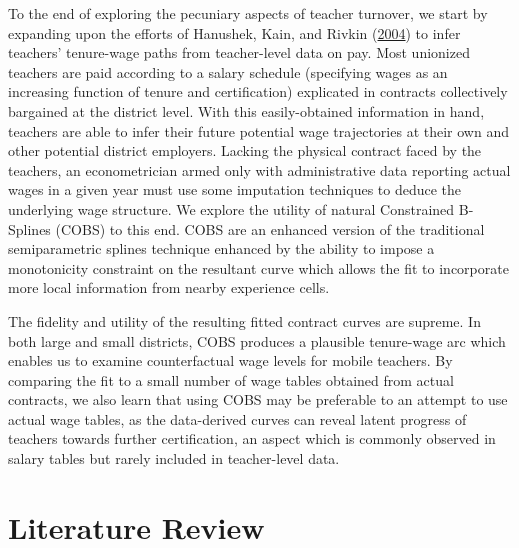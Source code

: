 \documentclass[12pt,]{article}
\newcommand{\TAG}[1]{}
\begin{document}
To the end of exploring the pecuniary aspects of teacher turnover, we
start by expanding upon the efforts of Hanushek, Kain, and Rivkin
(\protect\hyperlink{ref-hanushek}{2004}) to infer teachers' tenure-wage
paths from teacher-level data on pay. Most unionized teachers are paid
according to a salary schedule (specifying wages as an increasing
function of tenure and certification) explicated in contracts
collectively bargained at the district level. With this easily-obtained
information in hand, teachers are able to infer their future potential
wage trajectories at their own and other potential district employers.
Lacking the physical contract faced by the teachers, an econometrician
armed only with administrative data reporting actual wages in a given
year must use some imputation techniques to deduce the underlying wage
structure. We explore the utility of natural Constrained B-Splines
(COBS) to this end. COBS are an enhanced version of the traditional
semiparametric splines technique enhanced by the ability to impose a
monotonicity constraint on the resultant curve which allows the fit to
incorporate more local information from nearby experience cells.

The fidelity and utility of the resulting fitted contract curves are
supreme. In both large and small districts, COBS produces a plausible
tenure-wage arc which enables us to examine counterfactual wage levels
for mobile teachers. By comparing the fit to a small number of wage
tables obtained from actual contracts, we also learn that using COBS may
be preferable to an attempt to use actual wage tables, as the
data-derived curves can reveal latent progress of teachers towards
further certification, an aspect which is commonly observed in salary
tables but rarely included in teacher-level data.

\TAG{END_INTRO}

\section{Literature Review}\label{literature-review}

\TAG{BEGIN_BODY}
\end{document}
